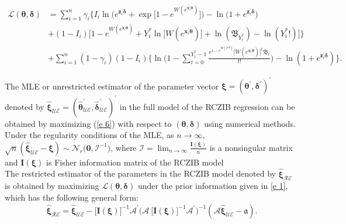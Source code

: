 \documentclass[twoside]{article}
\begin{document}
\begin{footnotesize}
\begin{align}\label{e 6}
\mathcal{L} ( \boldsymbol{ \theta } , \boldsymbol{ \delta } ) & =  \sum_{ i = 1 }^n   \gamma_i 
\Bigg \lbrace
I_i \ln 
\Big (
e^{ \boldsymbol{z}_i^\prime \boldsymbol{ \delta } } + \exp{ \big [ 1 -  e^{W ( e^{\boldsymbol{x}_i^\prime \boldsymbol{ \theta }  } ) }  \big ] }
\Big ) 
- \ln \big ( 1 + e^{ \boldsymbol{z}_i^\prime \boldsymbol{ \delta } } \big )
\nonumber \\
& +  ( 1 - I_i ) 
\Big [ 
1 -  e^{ W ( e^{ \boldsymbol{x}_i^\prime \boldsymbol{ \theta }} ) }
+ Y_i^* \ln \big [ W ( e^{ \boldsymbol{x}_i^\prime \boldsymbol{ \theta }} ) \big ]
+ \ln ( \mathfrak{B}_{Y_i^*} )
- \ln ( Y_i^* ! )
\Big ] 
\Bigg \rbrace
\nonumber \\ 
&  +   \sum_{ i = 1 }^n ( 1 - \gamma_i ) ( 1 - I_i ) 
\Bigg \lbrace
\ln \Big ( 1 - \sum_{ t = 0 }^{ Y_i^* - 1 } \frac{ 
e^{ 1 -  e^{W ( e^{\boldsymbol{x}_i^\prime \boldsymbol{ \theta }  } ) } }
\big [ W ( e^{\boldsymbol{x}_i^\prime \boldsymbol{ \theta } } ) \big ] ^t
\mathfrak{B}_t }
{ t ! } \Big ) - 
\ln ( 1 + e^{ \boldsymbol{z}_i^\prime \boldsymbol{ \delta } } ) 
\Bigg \rbrace .
\end{align}
\end{footnotesize}
The MLE or unrestricted estimator of the parameter vector 
$ \boldsymbol{ \xi } = ( \boldsymbol{ \theta }^\prime , \boldsymbol{ \delta }^\prime  )^\prime $
denoted by 
$ \hat{ \boldsymbol{ \xi } }_{ \mathcal{UE} } = ( \hat{ \boldsymbol{ \theta } }_{ \mathcal{UE} }^\prime , \hat{ \boldsymbol{ \delta } }_{ \mathcal{UE} }^\prime )^\prime $
in the full model of the RCZIB regression can be obtained by maximizing (\ref{e 6}) with respect to 
$ ( \boldsymbol{ \theta } , \boldsymbol{ \delta } ) $
using numerical methods. Under the regularity conditions of the MLE, as 
$ n \to \infty $,
$ \sqrt{n} ( \hat{ \boldsymbol{ \xi } }_{ \mathcal{UE} } - \boldsymbol{ \xi } ) \sim \boldsymbol{ \mathcal{N} }_{r} \big ( \boldsymbol{0} , \boldsymbol{ \mathcal{I} }^{-1} \big ) $,
where 
$ \boldsymbol{ \mathcal{I} } = \lim_{ n \rightarrow \infty } \frac{\boldsymbol{I} ( \boldsymbol{ \xi } )}{n}  $
is a nonsingular matrix and
$ \boldsymbol{I} ( \boldsymbol{ \xi } ) $
is Fisher information matrix of the RCZIB model
\\
The restricted estimator of the parameters in the RCZIB model denoted by 
$ \hat{ \boldsymbol{ \xi } }_{ \mathcal{RE} } $
is obtained by maximizing
$ \mathcal{L} ( \boldsymbol{ \theta } , \boldsymbol{ \delta } ) $
under the prior information given in \eqref{e 1}, which has the following general form:
\begin{equation}\label{e 8}
\hat{ \boldsymbol{ \xi } }_{ \mathcal{RE} } =  \hat{ \boldsymbol{\xi} }_{ \mathcal{UE} }  - \big [ \boldsymbol{I} ( \boldsymbol{ \xi } ) \big ]^{-1}  \boldsymbol{\mathcal{A}}^\prime  \Big ( \boldsymbol{\mathcal{A}} \ \big [ \boldsymbol{I} ( \boldsymbol{ \xi } ) \big ]^{-1} \boldsymbol{\mathcal{A}}^\prime  \Big )^{-1}  ( \boldsymbol{\mathcal{A}} \hat{ \boldsymbol{\xi} }_{ \mathcal{UE} } - \boldsymbol{ \mathfrak{a} }  ) .
\end{equation}
\end{document}
